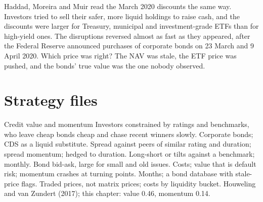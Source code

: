 \begin{omfigure}

\label{fig:s2:systematic-credit-and-bond-etf-arbitrage:etf}
\end{omfigure}

Haddad, Moreira and Muir read the March 2020 discounts the same way. Investors tried to sell their safer, more liquid holdings to raise cash, and the
discounts were larger for Treasury, municipal and investment-grade ETFs than for high-yield ones. The disruptions reversed almost as fast as they
appeared, after the Federal Reserve announced purchases of corporate bonds on 23 March and 9 April 2020. Which price was right? The NAV was stale, the
ETF price was pushed, and the bonds' true value was the one nobody observed.

\section{Strategy files}

\begin{strategyfile}{Credit value and momentum}\label{strat:s2:systematic-credit-and-bond-etf-arbitrage:factors}
 Investors constrained by ratings and benchmarks, who leave cheap bonds cheap and chase recent winners slowly.
 Corporate bonds; CDS as a liquid substitute.
 Spread against peers of similar rating and duration; spread momentum; hedged to duration.
 Long-short or tilts against a benchmark; monthly.
 Bond bid-ask, large for small and old issues.
 Costs; value that is default risk; momentum crashes at turning points.
 Months; a bond database with stale-price flags.
 Traded prices, not matrix prices; costs by liquidity bucket.
 Houweling and van Zundert (2017); this chapter: value 0.46, momentum 0.14.
\end{strategyfile}

